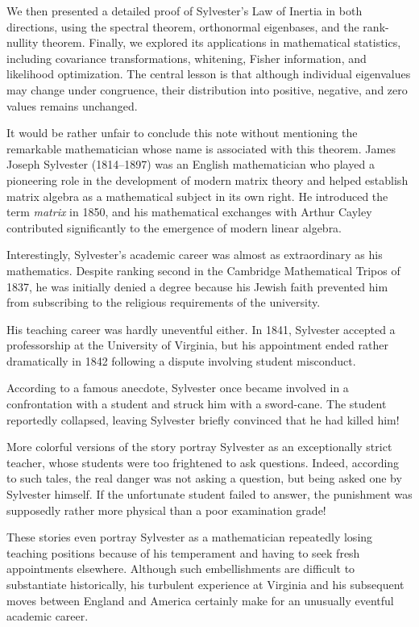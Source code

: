 \documentclass[11pt]{article}
\theoremstyle{definition}
\theoremstyle{remark}
\begin{document}
We then presented a detailed proof of Sylvester's
Law of Inertia in both directions, using the
spectral theorem, orthonormal eigenbases, and
the rank-nullity theorem. Finally, we explored
its applications in mathematical statistics,
including covariance transformations, whitening,
Fisher information, and likelihood optimization.
The central lesson is that although individual
eigenvalues may change under congruence, their
distribution into positive, negative, and zero
values remains unchanged.

It would be rather unfair to conclude this note
without mentioning the remarkable mathematician
whose name is associated with this theorem.
James Joseph Sylvester (1814--1897) was an English
mathematician who played a pioneering role in
the development of modern matrix theory and
helped establish matrix algebra as a mathematical
subject in its own right. He introduced the
term \emph{matrix} in 1850, and his mathematical
exchanges with Arthur Cayley contributed
significantly to the emergence of modern
linear algebra.

Interestingly, Sylvester's academic career
was almost as extraordinary as his mathematics.
Despite ranking second in the Cambridge
Mathematical Tripos of 1837, he was initially
denied a degree because his Jewish faith
prevented him from subscribing to the religious
requirements of the university.

His teaching career was hardly uneventful either.
In 1841, Sylvester accepted a professorship at
the University of Virginia, but his appointment
ended rather dramatically in 1842 following a
dispute involving student misconduct.

According to a famous anecdote, Sylvester once
became involved in a confrontation with a student
and struck him with a sword-cane. The student
reportedly collapsed, leaving Sylvester briefly
convinced that he had killed him!

More colorful versions of the story portray
Sylvester as an exceptionally strict teacher,
whose students were too frightened to ask
questions. Indeed, according to such tales,
the real danger was not asking a question,
but being asked one by Sylvester himself.
If the unfortunate student failed to answer,
the punishment was supposedly rather more
physical than a poor examination grade!

These stories even portray Sylvester as a
mathematician repeatedly losing teaching
positions because of his temperament and
having to seek fresh appointments elsewhere.
Although such embellishments are difficult
to substantiate historically, his turbulent
experience at Virginia and his subsequent
moves between England and America certainly
make for an unusually eventful academic career.
\end{document}
